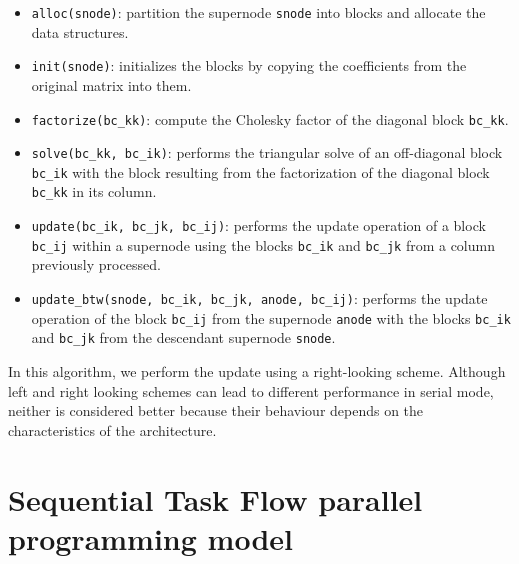 \documentclass{article}
\newcommand{\lsection}[1]{\section{#1} \setcounter{equation}{0} \setcounter{figure}{0} \setcounter{table}{0} \label{#1}}
\begin{document}
\begin{itemize}
\item \texttt{alloc(snode)}: partition the supernode \texttt{snode}
  into blocks and allocate the data structures.
\item \texttt{init(snode)}: initializes the blocks by copying the
  coefficients from the original matrix into them.
\item \texttt{factorize(bc\_kk)}: compute the Cholesky factor of the
  diagonal block \texttt{bc\_kk}.
\item \texttt{solve(bc\_kk, bc\_ik)}: performs the triangular solve of
  an off-diagonal block \texttt{bc\_ik} with the block resulting from
  the factorization of the diagonal block \texttt{bc\_kk} in its
  column.
\item \texttt{update(bc\_ik, bc\_jk, bc\_ij)}: performs the update
  operation of a block \texttt{bc\_ij} within a supernode using the
  blocks \texttt{bc\_ik} and \texttt{bc\_jk} from a column previously
  processed.
\item \texttt{update\_btw(snode, bc\_ik, bc\_jk, anode, bc\_ij)}:
  performs the update operation of the block \texttt{bc\_ij} from the
  supernode \texttt{anode} with the blocks \texttt{bc\_ik} and
  \texttt{bc\_jk} from the descendant supernode \texttt{snode}.
\end{itemize}

In this algorithm, we perform the update using a
right-looking scheme. Although left and right looking schemes can
lead to different performance in serial mode, neither is
considered better because their behaviour depends on the
characteristics of the architecture.

\lsection{Sequential Task Flow parallel programming model}\label{sec:stf-model}
\end{document}
